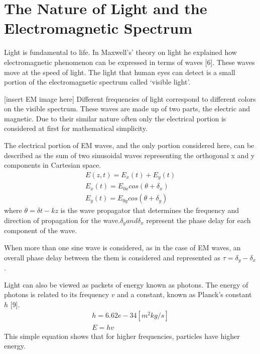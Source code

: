 \section{The Nature of Light and the Electromagnetic Spectrum}
Light is fundamental to life.  In Maxwell’s’ theory on light he explained how electromagnetic phenomenon can be expressed in terms of waves [6].  These waves move at the speed of light.  The light that human eyes can detect is a small portion of the electromagnetic spectrum called ‘visible light’.

[insert EM image here]
Different frequencies of light correspond to different colors on the visible spectrum.  These waves are made up of two parts, the electric and magnetic.  Due to their similar nature often only the electrical portion is considered at first for mathematical simplicity.

The electrical portion of EM waves, and the only portion considered here, can be described as the sum of two sinusoidal waves representing the orthogonal x and y components in Cartesian space.
%
\begin{align}
    E(z,t)=E_x (t)+E_y (t)\\
    E_x (t)=E_{0x} cos( \theta+\delta_x )\\
    E_y (t)=E_{0y} cos( \theta+\delta_y )
\end{align}
%
where $ \theta = \delta t-kz $ is the wave propagator that determines the frequency and direction of propagation for the wave.$ \delta_y and \delta_x $ represent the phase delay for each component of the wave.

When more than one sine wave is considered, as in the case of EM waves, an overall phase delay between the them is considered and represented as $ \tau=\delta_y-\delta_x $.

Light can also be viewed as packets of energy known as photons.  The energy of photons is related to its frequency $v$ and a constant, known as Planck’s constant $h$ [9].
%
\begin{align}
	h=6.62e-34 [m^2 kg/s]\\
	E=hv
\end{align}
%
This simple equation shows that for higher frequencies, particles have higher energy.






